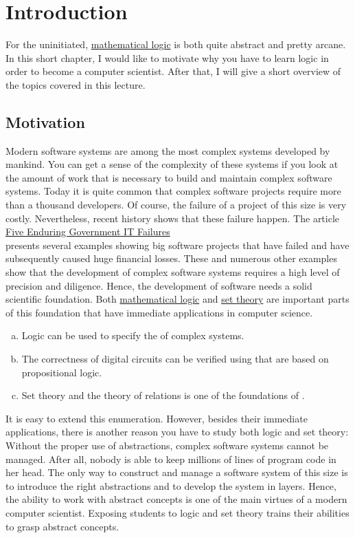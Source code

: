 \chapter{Introduction}
For the uninitiated, \href{https://en.wikipedia.org/wiki/Mathematical_logic}{mathematical logic} 
is both quite abstract and pretty arcane.  
In this short chapter, I would like to motivate why you have to learn
logic in order to become a computer scientist.  After that, I will give a short overview of the topics covered
in this lecture.

\section{Motivation}
Modern software systems are among the most complex systems developed by mankind.  You can get a
sense of the complexity of these systems if you look at the amount of work that is necessary to
build and maintain complex software systems.  Today it is quite common that complex software projects require
more than a thousand developers.  Of course, the failure of a project of this size is very costly.
Nevertheless, recent history shows that these failure happen.  The article
\\[0.2cm]
\hspace*{0.8cm}
\href{https://spectrum.ieee.org/five-enduring-government-it-failures}{Five Enduring Government IT Failures} 
\\[0.2cm]
presents several examples showing big software projects that have failed and have subsequently caused huge
financial losses.  
These and numerous other examples show that the development of complex software systems requires a high level
of precision and diligence.  Hence, the development of software needs a solid scientific
foundation.  Both \href{https://en.wikipedia.org/wiki/Mathematical_logic}{mathematical logic} and 
\href{https://en.wikipedia.org/wiki/Set_theory}{set theory}
are important parts of this foundation that have immediate applications in
computer science. 
\begin{enumerate}[(a)]
\item Logic can be used to specify the  of complex systems.  
\item The correctness of digital circuits can be verified using  that are based on
      propositional logic.
\item Set theory and the theory of relations is one of the foundations of .
\end{enumerate}
It is easy to extend this enumeration.  However, besides their immediate applications, 
there is another reason you have to study both logic and set theory: Without the proper use of
{\color{blue}abstractions}, complex software systems cannot be managed.  After all, nobody is able to keep
millions of lines of program code in her head.  The only way to construct and manage a software system of this
size is to introduce the right abstractions and to develop the system in layers.  Hence, the ability
to work with abstract concepts is one of the main virtues of a modern computer scientist.  
Exposing students to logic and set theory trains their abilities to grasp abstract concepts.

